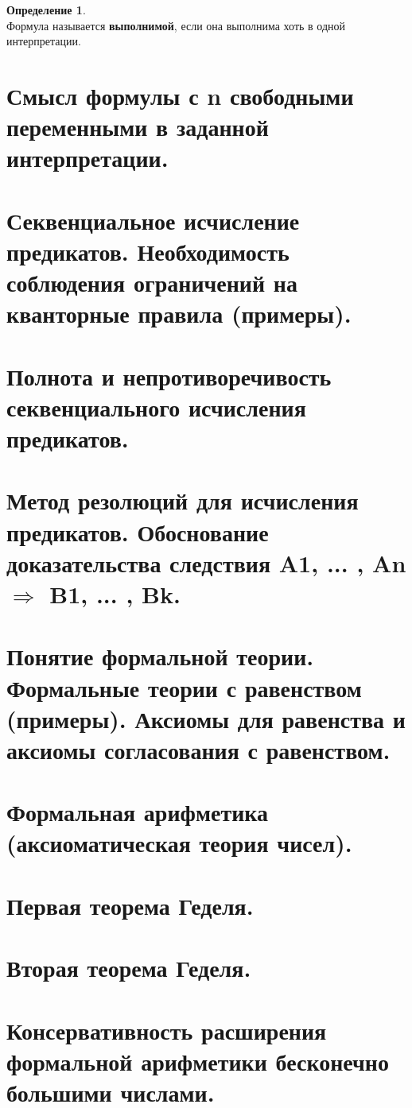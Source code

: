 \documentclass[a4paper,12pt]{article}
\theoremstyle{definition} %
\newtheorem{definition}{Определение}[section]
\theoremstyle{definition} %
\theoremstyle{remark} %
\begin{document}
	\begin{definition}\ \\[1ex]
		Формула называется \textbf{выполнимой}, если она выполнима хоть в одной интерпретации.
	\end{definition}

\section{Смысл формулы с n свободными переменными в заданной интерпретации.}

\section{Секвенциальное исчисление предикатов. Необходимость соблюдения ограничений на кванторные правила (примеры).}

\section{Полнота и непротиворечивость секвенциального исчисления предикатов.}

\section{Метод резолюций для исчисления предикатов. Обоснование доказательства следствия A1, ... ,	An $\Rightarrow$ B1, ... , Bk.}

\section{Понятие формальной теории. Формальные теории с равенством (примеры). Аксиомы для	равенства и аксиомы согласования с равенством.}

\section{Формальная арифметика (аксиоматическая теория чисел).}

\section{Первая теорема Геделя.}

\section{Вторая теорема Геделя.}

\section{Консервативность расширения формальной арифметики бесконечно большими числами.}
\end{document}
